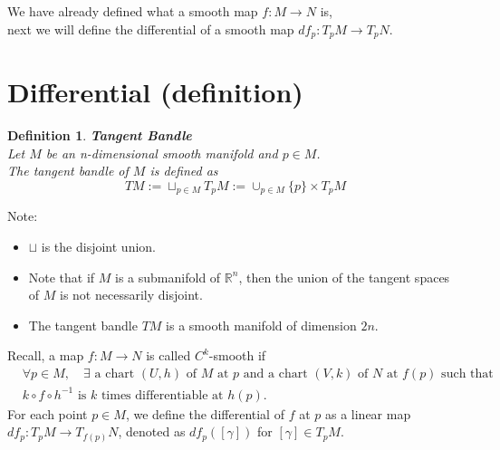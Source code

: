 \documentclass[11pt]{book} %
\newtheorem{definition}{Definition}[section]
\begin{document}
We have already defined what a smooth map $f : M \to N$ is, \\
next we will define the differential of a smooth map $df_p : T_pM \to T_pN$.



\section{Differential (definition)}

\begin{definition}{\textbf{Tangent Bandle}} \\
    Let \( M \) be an n-dimensional smooth manifold and \( p \in M \). \\
    The tangent bandle of \( M \) is defined as
    \begin{equation*}
        TM := \sqcup _{p \in M} T_pM := \cup_{p \in M} \{ p \} \times T_pM
    \end{equation*}
\end{definition}

Note:
\begin{itemize}
    \item  $\sqcup$ is the disjoint union.
    \item Note that if \( M \) is a submanifold of \( \mathbb{R}^n \), then the union of the tangent spaces of \( M \) is not necessarily disjoint.
    \item The tangent bandle \( TM \) is a smooth manifold of dimension \( 2n \).
\end{itemize}

Recall, a map \( f: M \to N \) is called $C^k$-smooth if 
\begin{align*}
    &\forall p \in M, \quad \exists \text{ a chart } (U, h) \text{ of } M \text{ at } p \text{ and a chart } (V, k) \text{ of } N \text{ at } f(p) \text{ such that } \\
    &k \circ f \circ h^{-1} \text{ is } k \text{ times differentiable at } h(p).
\end{align*}
For each point $p \in M$, we define the differential of $f$ at $p$ as a linear map $df_p : T_pM \to T_{f(p)}N$, denoted as $df_p([\gamma])$ for $[\gamma] \in T_pM$.
\end{document}
